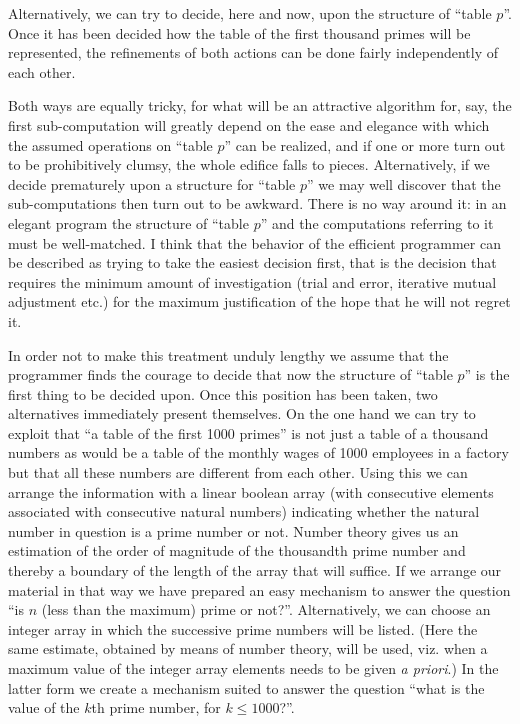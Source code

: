 Alternatively, we can try to decide, here and now, upon the structure of ``table $p$''. Once it has been decided how the table of the first thousand primes will be represented, the refinements of both actions can be done fairly independently of each other.

Both ways are equally tricky, for what will be an attractive algorithm for, say, the first sub-computation will greatly depend on the ease and elegance with which the assumed operations on ``table $p$'' can be realized, and if one or more turn out to be prohibitively clumsy, the whole edifice falls to pieces. Alternatively, if we decide prematurely upon a structure for ``table $p$'' we may well discover that the sub-computations then turn out to be awkward. There is no way around it: in an elegant program the structure of ``table $p$'' and the computations referring to it must be well-matched. I think that the behavior of the efficient programmer can be described as trying to take the easiest decision first, that is the decision that requires the minimum amount of investigation (trial and error, iterative mutual adjustment etc.) for the maximum justification of the hope that he will not regret it.

In order not to make this treatment unduly lengthy we assume that the programmer finds the courage to decide that now the structure of ``table $p$'' is the first thing to be decided upon. Once this position has been taken, two alternatives immediately present themselves. On the one hand we can try to exploit that ``a table of the first 1000 primes'' is not just a table of a thousand numbers \textemdash{}  as would be a table of the monthly wages of 1000 employees in a factory \textemdash{}  but that all these numbers are different from each other. Using this we can arrange the information with a linear boolean array (with consecutive elements associated with consecutive natural numbers) indicating whether the natural number in question is a prime number or not. Number theory gives us an estimation of the order of magnitude of the thousandth prime number and thereby a boundary of the length of the array that will suffice. If we arrange our material in that way we have prepared an easy mechanism to answer the question ``is $n$ (less than the maximum) prime or not?''. Alternatively, we can choose an integer array in which the successive prime numbers will be listed. (Here the same estimate, obtained by means of number theory, will be used, viz. when a maximum value of the integer array elements needs to be given \textit{a priori}.) In the latter form we create a mechanism suited to answer the question ``what is the value of the $k$th prime number, for $k \leqslant 1000$?''.

